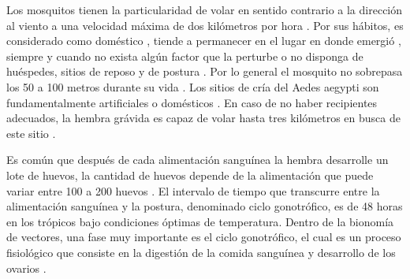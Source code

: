 Los mosquitos tienen la particularidad de volar en sentido contrario a la dirección al viento
\cite{ThironIzcazaJ2003, web-site:speedAnimals} a una velocidad máxima de dos kilómetros por hora
\cite{web-site:speedAnimals,kaufmann2004flight}. Por sus hábitos, es considerado como doméstico
\cite{luevano1993ciclo}, tiende a permanecer en el lugar en donde emergió
\cite{cabezas2005dengue,ThironIzcazaJ2003}, siempre y cuando no exista algún factor que la
perturbe o no disponga de huéspedes, sitios de reposo y de postura  \cite{ThironIzcazaJ2003}. Por
lo general el mosquito no sobrepasa los 50 a 100 metros durante su vida \cite{cabezas2005dengue}.
Los sitios de cría del Aedes aegypti son fundamentalmente artificiales o domésticos
\cite{directricesDetvArg}. En caso de no haber recipientes adecuados, la hembra grávida es capaz
de volar hasta tres kilómetros en busca de este sitio \cite{ThironIzcazaJ2003}.

Es común que después de cada alimentación sanguínea la hembra desarrolle un lote de huevos, la
cantidad de huevos depende de la alimentación que puede variar entre 100 a 200 huevos
\cite{cabezas2005dengue}. El intervalo de tiempo que transcurre entre la alimentación sanguínea y
la postura, denominado ciclo gonotrófico, es de 48 horas en los trópicos bajo condiciones óptimas
de temperatura\cite{ThironIzcazaJ2003}. Dentro de la bionomía de vectores, una fase muy importante
es el ciclo gonotrófico, el cual es un proceso fisiológico que consiste en la digestión de la
comida sanguínea y desarrollo de los ovarios \cite{luevano1993ciclo}.
